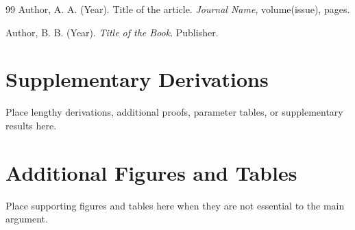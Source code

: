 \documentclass[11pt,a4paper]{article}
\begin{document}
\begin{thebibliography}{99}
  Author, A. A. (Year).
  Title of the article.
  \textit{Journal Name}, volume(issue), pages.

  Author, B. B. (Year).
  \textit{Title of the Book}.
  Publisher.
\end{thebibliography}

\appendix
\section{Supplementary Derivations}
Place lengthy derivations, additional proofs, parameter tables, or supplementary results here.

\section{Additional Figures and Tables}
Place supporting figures and tables here when they are not essential to the main argument.
\end{document}
